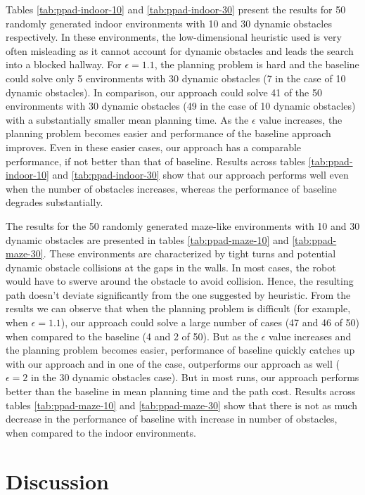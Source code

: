 Tables \ref{tab:ppad-indoor-10} and \ref{tab:ppad-indoor-30} present the results for 50 randomly generated indoor environments with 10 and 30 dynamic obstacles respectively. In these environments, the low-dimensional heuristic used is very often misleading as it cannot account for dynamic obstacles and leads the search into a blocked hallway. For $\epsilon=1.1$, the planning problem is hard and the baseline could solve only 5 environments with 30 dynamic obstacles (7 in the case of 10 dynamic obstacles). In comparison, our approach could solve 41 of the 50 environments with 30 dynamic obstacles (49 in the case of 10 dynamic obstacles) with a substantially smaller mean planning time. As the $\epsilon$ value increases, the planning problem becomes easier and performance of the baseline approach improves. Even in these easier cases, our approach has a comparable performance, if not better than that of baseline. Results across tables \ref{tab:ppad-indoor-10} and \ref{tab:ppad-indoor-30} show that our approach performs well even when the number of obstacles increases, whereas the performance of baseline degrades substantially.

The results for the 50 randomly generated maze-like environments with 10 and 30 dynamic obstacles are presented in tables \ref{tab:ppad-maze-10} and \ref{tab:ppad-maze-30}. These environments are characterized by tight turns and potential dynamic obstacle collisions at the gaps in the walls. In most cases, the robot would have to swerve around the obstacle to avoid collision. Hence, the resulting path doesn't deviate significantly from the one suggested by heuristic. From the results we can observe that when the planning problem is difficult (for example, when $\epsilon = 1.1$), our approach could solve a large number of cases (47 and 46 of 50) when compared to the baseline (4 and 2 of 50). But as the $\epsilon$ value increases and the planning problem becomes easier, performance of baseline quickly catches up with our approach and in one of the case, outperforms our approach as well ($\epsilon=2$ in the 30 dynamic obstacles case). But in most runs, our approach performs better than the baseline in mean planning time and the path cost. Results across tables \ref{tab:ppad-maze-10} and \ref{tab:ppad-maze-30} show that there is not as much decrease in the performance of baseline with increase in number of obstacles, when compared to the indoor environments.

\section{Discussion}
\label{sec:ppad-discussion}

